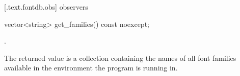  [\iotwod.text.fontdb.obs] { observers}

%
\begin{itemdecl}
vector<string> get_families() const noexcept;
\end{itemdecl}
\begin{itemdescr}
\pnum
\returns {}.

\pnum
\remarks
The returned value is a collection containing the names of all font families available in the environment the program is running in.
\end{itemdescr}
